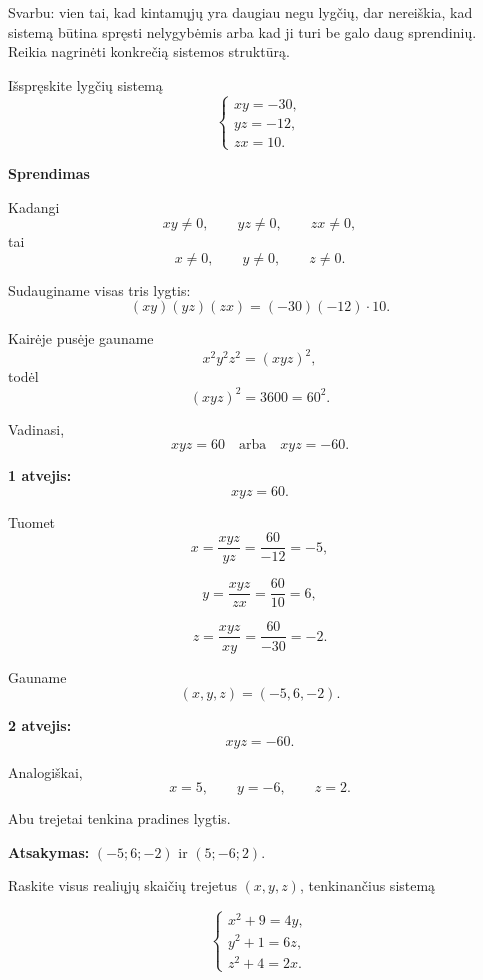 \documentclass[11pt,a4paper]{scrartcl}
\newenvironment{solution}
    {\begin{list}{}{\setlength{\leftmargin}{10pt}\setlength{\rightmargin}{10pt}}\item[]}
    {\end{list}}
\begin{document}
Svarbu: vien tai, kad kintamųjų yra daugiau negu lygčių, dar nereiškia,
kad sistemą būtina spręsti nelygybėmis arba kad ji turi be galo daug
sprendinių. Reikia nagrinėti konkrečią sistemos struktūrą.

\begin{example}

Išspręskite lygčių sistemą
\[
\left\{
\begin{array}{l}
xy=-30,\\
yz=-12,\\
zx=10.
\end{array}
\right.
\]
\end{example}

\begin{solution}
\textbf{Sprendimas}

Kadangi
\[
xy\neq0,\qquad yz\neq0,\qquad zx\neq0,
\]
tai
\[
x\neq0,\qquad y\neq0,\qquad z\neq0.
\]

Sudauginame visas tris lygtis:
\[
(xy)(yz)(zx)=(-30)(-12)\cdot10.
\]

Kairėje pusėje gauname
\[
x^2y^2z^2=(xyz)^2,
\]
todėl
\[
(xyz)^2=3600=60^2.
\]

Vadinasi,
\[
xyz=60
\quad\text{arba}\quad
xyz=-60.
\]

\textbf{1 atvejis:}
\[
xyz=60.
\]

Tuomet
\[
x=\frac{xyz}{yz}
=\frac{60}{-12}
=-5,
\]

\[
y=\frac{xyz}{zx}
=\frac{60}{10}
=6,
\]

\[
z=\frac{xyz}{xy}
=\frac{60}{-30}
=-2.
\]

Gauname
\[
(x,y,z)=(-5,6,-2).
\]

\textbf{2 atvejis:}
\[
xyz=-60.
\]

Analogiškai,
\[
x=5,\qquad y=-6,\qquad z=2.
\]

Abu trejetai tenkina pradines lygtis.

\textbf{Atsakymas:} $(-5;6;-2)$ ir $(5;-6;2)$.
\end{solution}

\begin{example}

Raskite visus realiųjų skaičių trejetus $(x,y,z)$, tenkinančius sistemą

\[
\left\{
\begin{array}{l}
x^2+9=4y,\\
y^2+1=6z,\\
z^2+4=2x.
\end{array}
\right.
\]
\end{example}
\end{document}
